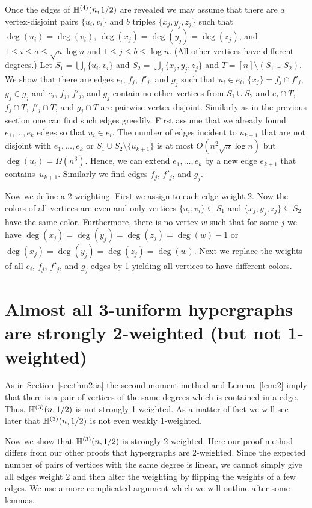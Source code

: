 \documentclass[12pt,reqno]{amsart}
\begin{document}
Once the edges of $\mathbb{H}^{({4})}(n,1/2)$ are revealed we may assume that there are $a$ vertex-disjoint pairs $\{u_i,v_i\}$ and $b$ triples $\{x_j,y_j,z_j\}$ such that  $\deg(u_i) = \deg(v_i)$, $\deg(x_j) = \deg(y_j) = \deg(z_j)$, and $1\le i \le a\le \sqrt{n}\log n$ and $1\le j\le b \le \log n$. (All other vertices have different degrees.)
Let $S_1 = \bigcup_i \{u_i,v_i\}$ and $S_2=\bigcup_j \{x_j,y_j,z_j\}$ and $T = [n] \setminus (S_1\cup S_2)$. We show that there are edges $e_i$, $f_j$, $f'_j$, and $g_j$ such that $u_i\in e_i$, $\{x_j\}= f_j\cap f'_j$, $y_j\in g_j$ and $e_i$, $f_j$, $f'_j$, and $g_j$  contain no other vertices from $S_1\cup S_2$ and $e_i\cap T$, $f_j\cap T$, $f'_j\cap T$, and $g_j\cap T$ are pairwise vertex-disjoint. 
Similarly as in the previous section one can find such edges greedily. First assume that we already found $e_1,\dots,e_k$ edges so that $u_i\in e_i$. The number of edges incident to $u_{k+1}$ that are not disjoint with $e_1,\dots,e_k$ or $S_1\cup S_2 \setminus\{u_{k+1}\}$ is at most $O(n^2\sqrt{n}\log n)$ but $\deg(u_i)=\Omega(n^3)$. Hence, we can extend $e_1,\dots,e_{k}$ by a new edge $e_{k+1}$ that contains~$u_{k+1}$.
Similarly we find edges $f_j$, $f'_j$, and $g_j$. 

Now we define a 2-weighting. First we assign to each edge weight 2. Now the colors of all vertices are even and only vertices $\{u_i,v_i\}\subseteq S_1$ and $\{x_j,y_j,z_j\}\subseteq S_2$ have the same color. Furthermore, there is no vertex $w$ such that for some $j$ we have $\deg(x_j) = \deg(y_j) = \deg(z_j) = \deg(w)-1$ or $\deg(x_j) = \deg(y_j) = \deg(z_j) = \deg(w)$.  Next we replace the weights of all  $e_i$, $f_j$, $f'_j$, and $g_j$ edges by 1 yielding all vertices to have different colors.

\section{Almost all 3-uniform hypergraphs are strongly 2-weighted (but not 1-weighted)}\label{sec:thm2:ib}

As in Section~\ref{sec:thm2:ia} the second moment method and Lemma~\ref{lem:2} imply that \whp there is a pair of vertices of the same degrees which is contained in a edge. Thus, \whp $\mathbb{H}^{({3})}(n,1/2)$ is not strongly 1-weighted. As a matter of fact we will see later that \whp $\mathbb{H}^{({3})}(n,1/2)$ is not even weakly 1-weighted.

Now we show that \whp $\mathbb{H}^{({3})}(n,1/2)$ is strongly 2-weighted. Here our proof method differs from our other proofs that hypergraphs are 2-weighted. Since the expected number of pairs of vertices with the same degree is linear, we cannot simply give all edges weight 2 and then alter the weighting by flipping the weights of a few edges. We use a more complicated argument which we will outline after some lemmas.
\end{document}
